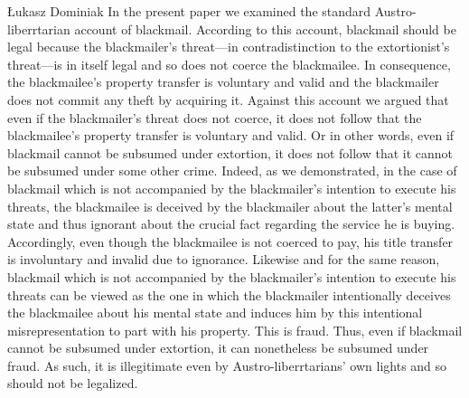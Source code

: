 \begin{artengenv}{Łukasz Dominiak}
In the present paper we examined the standard Austro-liberrtarian account of blackmail. According to this account, blackmail should be legal because the blackmailer's threat---in contradistinction to the extortionist's threat---is in itself legal and so does not coerce the blackmailee. In consequence, the blackmailee's property transfer is voluntary and valid and the blackmailer does not commit any theft by acquiring it. Against this account we argued that even if the blackmailer's threat does not coerce, it does not follow that the blackmailee's property transfer is voluntary and valid. Or in other words, even if blackmail cannot be subsumed under extortion, it does not follow that it cannot be subsumed under some other crime. Indeed, as we demonstrated, in the case of blackmail which is not accompanied by the blackmailer's intention to execute his threats, the blackmailee is deceived by the blackmailer about the latter's mental state and thus ignorant about the crucial fact regarding the service he is buying. Accordingly, even though the blackmailee is not coerced to pay, his title transfer is involuntary and invalid due to ignorance. Likewise and for the same reason, blackmail which is not accompanied by the blackmailer's intention to execute his threats can be viewed as the one in which the blackmailer intentionally deceives the blackmailee about his mental state and induces him by this intentional misrepresentation to part with his property. This is fraud. Thus, even if blackmail cannot be subsumed under extortion, it can nonetheless be subsumed under fraud. As such, it is illegitimate even by Austro-liberrtarians' own lights and so should not be legalized.



\end{artengenv}

